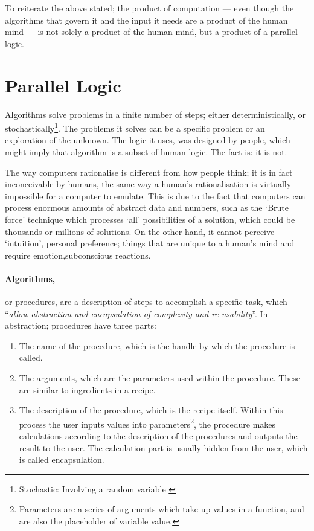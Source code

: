 To reiterate the above stated; the product of computation --- even though the algorithms that govern it and the input it needs are a product of the human mind --- is not solely a product of the human mind, but a product of a parallel logic.

\section{Parallel Logic}

Algorithms solve problems in a finite number of steps; either deterministically, or stochastically\footnote{Stochastic: Involving a random variable \cite{merriam03}}. The problems it solves can be a specific problem or an exploration of the unknown. The logic it uses, was designed by people, which might imply that algorithm is a subset of human logic. The fact is: it is not.

The way computers rationalise is different from how people think; it is in fact inconceivable by humans, the same way a human's rationalisation is virtually impossible for a computer to emulate.  This is due to the fact that computers can process enormous amounts of abstract data and numbers, such as the `Brute force' technique which processes `all' possibilities of a solution, which could be thousands or millions of solutions. On the other hand, it cannot perceive `intuition', personal preference; things that are unique to a human's mind and require emotion,subconscious reactions.

\paragraph{Algorithms,}or procedures, are a description of steps to accomplish a specific task, which ``\emph{allow abstraction and encapsulation of complexity and re-usability}''\cite{hernandez06}. In abstraction; procedures have three parts:
\begin{enumerate}
  \item The name of the procedure, which is the handle by which the procedure is called.
  \item The arguments, which are the parameters used within the procedure. These are similar to ingredients in a recipe.
  \item The description of the procedure, which is the recipe itself. Within this process the user inputs values into parameters\footnote{Parameters are a series of arguments which take up values in a function, and are also the placeholder of variable value.}, the procedure makes calculations according to the description of the procedures and outputs the result to the user. The calculation part is usually hidden from the user, which is called encapsulation.
\end{enumerate}

